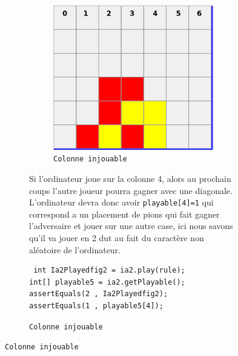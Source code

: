 \begin{figure}[H]
\begin{figure}[H]
\begin{figure}[H]
\begin{center}
  \includegraphics[scale=0.2]{playable10}
  \caption{\texttt{Colonne injouable}}
\end{center}
\end{figure}

Si l'ordinateur joue sur la colonne 4, alors au prochain coups l'autre joueur 
pourra gagner avec une diagonale. L'ordinateur devra donc avoir
\texttt{playable[4]=1} qui correspond a un placement de pions qui fait gagner l'adversaire
 et jouer sur une autre case, ici nous savons qu'il va jouer en 2
dut au fait du caractère non aléatoire de l'ordinateur.

\begin{verbatim}
 int Ia2Playedfig2 = ia2.play(rule);
int[] playable5 = ia2.getPlayable();
assertEquals(2 , Ia2Playedfig2);
assertEquals(1 , playable5[4]);
\end{verbatim}



\end{figure}
\end{figure}
